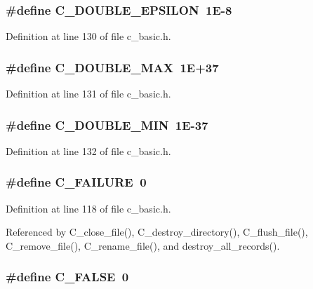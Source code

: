 \subsubsection{\setlength{\rightskip}{0pt plus 5cm}\#define C\_\-DOUBLE\_\-EPSILON~1E-8}\label{c__basic_8h_2f1eda54aa1018e8a508506df731afdc}




Definition at line 130 of file c\_\-basic.h.
\subsubsection{\setlength{\rightskip}{0pt plus 5cm}\#define C\_\-DOUBLE\_\-MAX~1E+37}\label{c__basic_8h_27adcdd70ee248b7cbdda9f37f67b714}




Definition at line 131 of file c\_\-basic.h.
\subsubsection{\setlength{\rightskip}{0pt plus 5cm}\#define C\_\-DOUBLE\_\-MIN~1E-37}\label{c__basic_8h_f348e9c3472fc4b224eaaff91bb2f8b3}




Definition at line 132 of file c\_\-basic.h.
\subsubsection{\setlength{\rightskip}{0pt plus 5cm}\#define C\_\-FAILURE~0}\label{c__basic_8h_749074ec3f0b0871cc9493814b4609d7}




Definition at line 118 of file c\_\-basic.h.

Referenced by C\_\-close\_\-file(), C\_\-destroy\_\-directory(), C\_\-flush\_\-file(), C\_\-remove\_\-file(), C\_\-rename\_\-file(), and destroy\_\-all\_\-records().
\subsubsection{\setlength{\rightskip}{0pt plus 5cm}\#define C\_\-FALSE~0}\label{c__basic_8h_189a9112cabcea4246b21447410d95cb}




